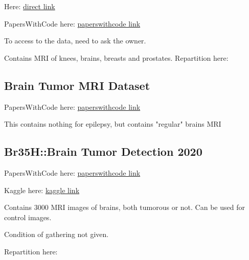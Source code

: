 Here: \href{https://fastmri.med.nyu.edu/}{direct link}

PapersWithCode here: \href{https://paperswithcode.com/dataset/fastmri}{paperswithcode link}

To access to the data, need to ask the owner.

Contains MRI of knees, brains, breasts and prostates. Repartition here: 

\begin{table}[htbp]
	\centering
	\caption{Repartition in the benchmark of FastMRI ()}
	\label{tab:FastMRI}
\end{table}

\subsection{Brain Tumor MRI Dataset}

PapersWithCode here: \href{https://paperswithcode.com/dataset/brain-tumor-mri-dataset}{paperswithcode link}

This contains nothing for epilepsy, but contains "regular" brains MRI

\subsection{Br35H::Brain Tumor Detection 2020}
\label{sub:sec:br35h}

PapersWithCode here: \href{https://paperswithcode.com/dataset/br35h-brain-tumor-detection-2020}{paperswithcode link}

Kaggle here: \href{https://www.kaggle.com/datasets/ahmedhamada0/brain-tumor-detection}{kaggle link}

Contains 3000 MRI images of brains, both tumorous or not. Can be used for control images.

Condition of gathering not given.

Repartition here: 

